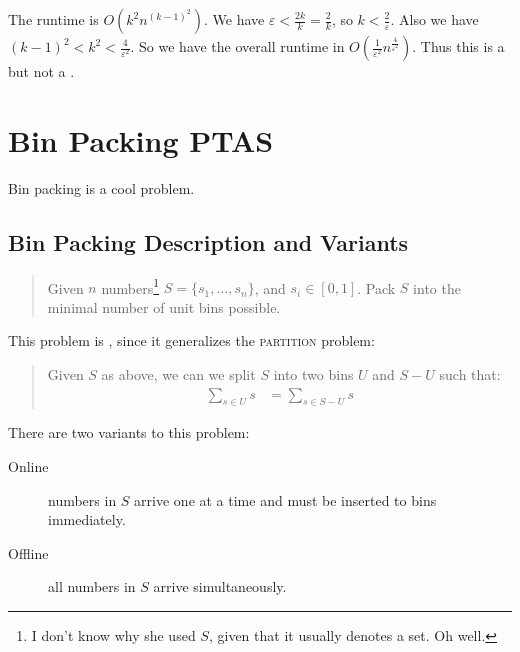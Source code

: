                 The runtime is $O(k^2 n^{(k-1)^2})$.
                We have $\varepsilon < \frac{2k}{k} = \frac{2}{k}$, so $k < \frac{2}{\varepsilon}$.
                Also we have $(k-1)^2 < k^2 < \frac{4}{\varepsilon^2}$.
                So we have the overall runtime in $O(\frac{1}{\varepsilon^2} n ^{\frac{4}{\varepsilon^2}})$.
                Thus this is a \ptas but not a \fptas.
        \chapter{Bin Packing PTAS} %
        \label{cha:bin_packing_ptas}
            Bin packing is a cool problem.

            \section{Bin Packing Description and Variants} %
            \label{sec:bin_packing_description_and_variants}
                \begin{quotation}
                    Given $n$ numbers\footnote{I don't know why she used $S$, given that it usually denotes a set. Oh well.} $S = \{s_1, \ldots, s_n\}$, and $s_i \in [0, 1]$.
                    Pack $S$ into the minimal number of unit bins possible.
                \end{quotation}

                This problem is \nphard, since it generalizes the \textsc{partition} problem:
                \begin{quotation}
                    Given $S$ as above, we can we split $S$ into two bins $U$ and $S-U$ such that:
                    \begin{align*}
                        \sum_{s \in U} s &= \sum_{s \in S-U} s
                    \end{align*}
                \end{quotation}

                There are two variants to this problem:
                \begin{description}
                    \item[Online] numbers in $S$ arrive one at a time and must be inserted to bins immediately.
                    \item[Offline] all numbers in $S$ arrive simultaneously.
                \end{description}
